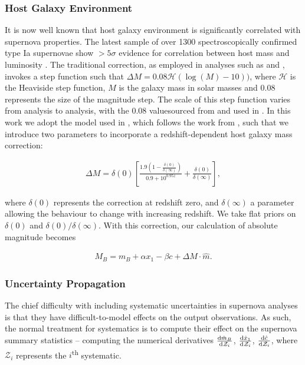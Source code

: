 \documentclass[a4paper,fleqn,usenatbib]{mnras}
\newcommand{\Z}{\mathcal{Z}}
\newcommand{\rubin}{\citetalias{Rubin2015}}
\begin{document}
\subsubsection{Host Galaxy Environment}

It is now well known that host galaxy environment is significantly correlated with supernova properties. The latest sample of over 1300 spectroscopically confirmed type Ia supernovae show $>5\sigma$ evidence for correlation between host mass and luminosity \citep{Uddin2017}. The traditional correction, as employed in analyses such as \citet{Suzuki2012} and \citet{Betoule2014}, invokes a step function such that $\Delta M = 0.08 \mathcal{H}(\log(M) - 10))$, where $\mathcal{H}$ is the Heaviside step function, $M$ is the galaxy mass in solar masses and $0.08$ represents the size of the magnitude step. The scale of this step function varies from analysis to analysis, with the 0.08 valuesourced from \cite{Sullivan2010} and used in \citet{Betoule2014}. In this work we adopt the model used in {\rubin}, which follows the work from \citet{Rigault2013}, such that we introduce two parameters to incorporate a redshift-dependent host galaxy mass correction:


\begin{align}
\Delta M = \delta(0) \left[ \frac{1.9\left(1 - \frac{\delta(0)}{\delta(\infty)}\right)  }{0.9 + 10^{0.95z}} + \frac{\delta(0)}{\delta(\infty)}\right], \label{eq:mass}
\end{align}

where $\delta(0)$ represents the correction at redshift zero, and $\delta(\infty)$ a parameter allowing the behaviour to change with increasing redshift. We take flat priors on $\delta(0)$ and $\delta(0)/\delta(\infty)$. With this correction, our calculation of absolute magnitude becomes

\begin{align}
M_B = m_B + \alpha x_1 - \beta c + \Delta M \cdot \hat{m}. \label{eq:l2}
\end{align}



\subsubsection{Uncertainty Propagation}
\label{sec:systreat}
The chief difficulty with including systematic uncertainties in supernova analyses is that they have difficult-to-model effects on the output observations. As such, the normal treatment for systematics is to compute their effect on the supernova summary statistics -- computing the numerical derivatives $\frac{{\rm d} \hat{m}_B}{{\rm d} \Z_i}$, $\frac{{\rm d} \hat{x}_1}{{\rm d} \Z_i}$, $\frac{{\rm d} \hat{c}}{{\rm d} \Z_i}$, where $\Z_i$ represents the $i$\textsuperscript{th} systematic.
\end{document}
